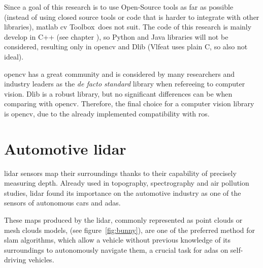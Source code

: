 Since a goal of this research is to use Open-Source tools as far as possible (instead of using closed source tools or code that is harder to integrate with other libraries), \ac{matlab} \acl{cv} Toolbox\texttrademark~does not suit. The code of this research is mainly develop in C++ (see chapter \citeneeded), so Python and Java libraries will not be considered, resulting only in \ac{opencv} and Dlib (Vlfeat uses plain C, so also not ideal). 

\ac{opencv} has a great community and is considered by many researchers and industry leaders as the \textit{de facto standard} library when refereeing to computer vision. Dlib is a robust library, but no significant differences can be when comparing with \ac{opencv}. Therefore, the final choice for a computer vision library is \ac{opencv}, due to the already implemented compatibility with \ac{ros}.




\section{Automotive \ac{lidar}}
\ac{lidar} sensors map their surroundings thanks to their capability of precisely measuring depth. Already used in topography, spectrography and air pollution studies, \ac{lidar} found its importance on the automotive industry as one of the sensors of autonomous cars and \ac{adas}\cite{Sullivan2016}. 

These maps produced by the \ac{lidar}, commonly represented as point clouds or mesh clouds models, (see figure~\ref{fig:bunny}), are one of the preferred method for \ac{slam} algorithms, which allow a vehicle without previous knowledge of its surroundings to autonomously navigate them, a crucial task for \ac{adas} on self-driving vehicles.

